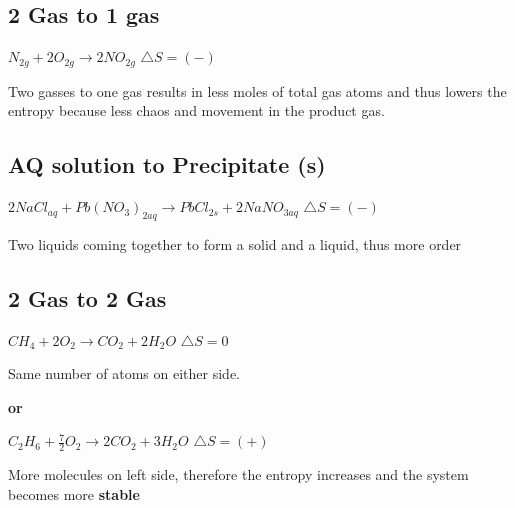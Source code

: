 \documentclass[12pt]{article} %
\begin{document}
\subsection{2 Gas to 1 gas}

$N_{2g} + 2O_{2g} \rightarrow 2NO_{2g}$
$\triangle{S} = (-)$

Two gasses to one gas results in less moles of total gas atoms and thus lowers the entropy because less chaos and movement in the product gas.

\subsection{AQ solution to Precipitate (s)}

$2NaCl_{aq} + Pb(NO_3)_{2aq} \rightarrow PbCl_{2s} + 2NaNO_{3aq}$
$\triangle{S} = (-)$

Two liquids coming together to form a solid and a liquid, thus more order

\subsection{2 Gas to 2 Gas}

$CH_4 + 2O_2 \rightarrow CO_2 + 2H_2O$
$\triangle{S} = 0$

Same number of atoms on either side.

\textbf{or}

$C_2H_6 + \frac{7}{2}O_2 \rightarrow 2CO_2 + 3H_2O$
$\triangle{S} = (+)$

More molecules on left side, therefore the entropy increases and the system becomes more \textbf{stable}
\end{document}
